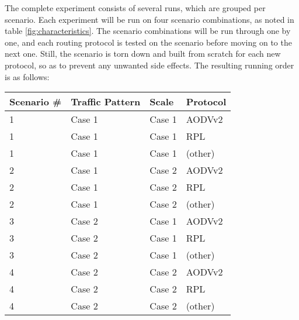 \documentclass{acm_proc_article-sp}
\begin{document}
The complete experiment consists of several runs, which are grouped per scenario.
Each experiment will be run on four scenario combinations, as noted in table \ref{fig:characteristics}. The scenario combinations will be run through one by one, and each routing protocol is tested on the scenario before moving on to the next one. Still, the scenario is torn down and built from scratch for each new protocol, so as to prevent any unwanted side effects. The resulting running order is as follows:

\begin{tabularx}{\linewidth}{l | X | l | X }
  Scenario \# & Traffic Pattern & Scale & Protocol \\
  \hline
  1 & Case 1 & Case 1 & AODVv2\\
  1 & Case 1 & Case 1 & RPL\\
  1 & Case 1 & Case 1 & (other)\\
  \hline
  2 & Case 1 & Case 2 & AODVv2\\
  2 & Case 1 & Case 2 & RPL\\
  2 & Case 1 & Case 2 & (other)\\
  \hline
  3 & Case 2 & Case 1 & AODVv2\\
  3 & Case 2 & Case 1 & RPL\\
  3 & Case 2 & Case 1 & (other)\\
  \hline
  4 & Case 2 & Case 2 & AODVv2\\
  4 & Case 2 & Case 2 & RPL\\
  4 & Case 2 & Case 2 & (other)\\
\end{tabularx}
\end{document}
